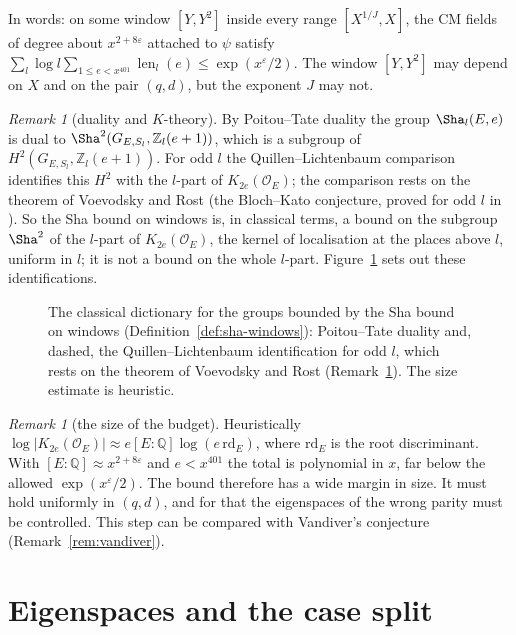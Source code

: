 \documentclass[11pt]{amsbook}
\theoremstyle{plain}
\theoremstyle{definition}
\theoremstyle{remark}
\newtheorem{remark}[theorem]{Remark}
\numberwithin{equation}{section}
\numberwithin{figure}{chapter}
\numberwithin{table}{chapter}
\newcommand{\Q}{\mathbb{Q}}
\newcommand{\Z}{\mathbb{Z}}
\newcommand{\eps}{\varepsilon}
\newcommand{\shalen}{\operatorname{len}}
\begin{document}
\noindent In words: on some window $[Y,Y^2]$ inside every range
$[X^{1/J},X]$, the CM fields of degree about $x^{2+8\eps}$ attached to
$\psi$ satisfy
$\sum_l\log l\sum_{1\le e<x^{401}}\shalen_l(e)\le\exp(x^\eps/2)$. The
window $[Y,Y^2]$ may depend on $X$ and on the pair $(q,d)$, but the
exponent $J$ may not.

\begin{remark}[duality and $K$-theory]\label{rem:poitou-tate}
By Poitou--Tate duality \cite{Tate1963,Poitou1967} the group
$\Sha_l(E,e)$ is dual to
$\Sha^2(G_{E,S_l},\Z_l(e+1))$, which is a subgroup of
$H^2(G_{E,S_l},\Z_l(e+1))$. For odd $l$ the Quillen--Lichtenbaum
comparison identifies this $H^2$ with the $l$-part of
$K_{2e}(\mathcal O_E)$; the comparison rests on the theorem of
Voevodsky and Rost (the Bloch--Kato conjecture, proved for odd $l$ in
\cite{Voevodsky2011}). So the Sha bound on windows is, in classical
terms, a bound on the subgroup $\Sha^2$ of the $l$-part of
$K_{2e}(\mathcal O_E)$, the kernel of localisation at the places
above $l$, uniform in $l$; it is not a bound on the whole $l$-part.
Figure~\ref{fig:duality} sets out these
identifications.
\end{remark}

\begin{figure}[htbp]
\centering

\caption{The classical dictionary for the groups bounded by the Sha
bound on windows (Definition~\ref{def:sha-windows}): Poitou--Tate
duality and, dashed, the Quillen--Lichtenbaum identification for odd
$l$, which rests on the theorem of Voevodsky and Rost
(Remark~\ref{rem:poitou-tate}). The size estimate is heuristic.}
\label{fig:duality}
\end{figure}

\begin{remark}[the size of the budget]\label{rem:budget}
Heuristically $\log|K_{2e}(\mathcal O_E)|\approx e[E:\Q]\log(e\,
\mathrm{rd}_E)$, where $\mathrm{rd}_E$ is the root discriminant. With
$[E:\Q]\approx x^{2+8\eps}$ and $e<x^{401}$ the total is polynomial in
$x$, far below the allowed $\exp(x^\eps/2)$. The bound therefore has
a wide margin in size. It must hold uniformly in $(q,d)$, and for
that the eigenspaces of the wrong parity must be controlled. This step can be
compared with Vandiver's
conjecture (Remark~\ref{rem:vandiver}).
\end{remark}

\section{Eigenspaces and the case split}
\end{document}
